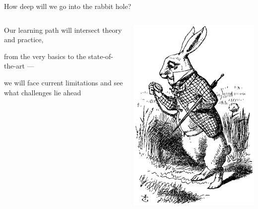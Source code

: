 \documentclass{beamer}
\begin{document}
\begin{frame}{How deep will we go into the rabbit hole?}

  \begin{minipage}[1\textheight]{\textwidth}
  \begin{columns}[c]
  \begin{column}{0.8\textwidth}

    Our learning path will intersect theory and practice,
  
    from the very basics to the state-of-the-art ---

    we will face current limitations and see what challenges lie ahead 

  \end{column}
  \begin{column}{0.2\textwidth}
    
    \includegraphics[scale=1.4]{Images/rabbit.png}
  \end{column}
  \end{columns}
  \end{minipage}

\end{frame}
\end{document}
